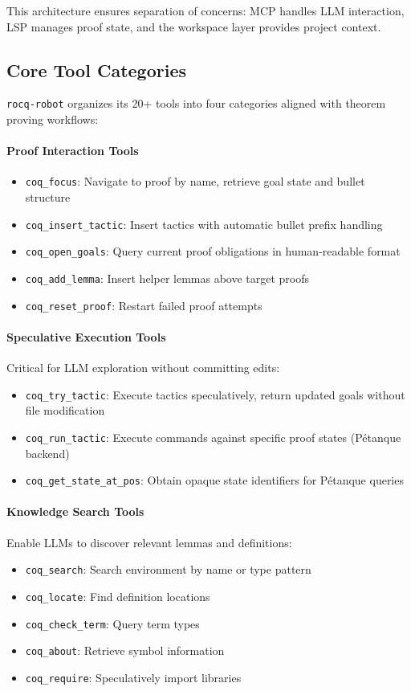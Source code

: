\documentclass[11pt,a4paper]{article}
\newcommand{\tool}{\texttt{rocq-robot}\xspace}
\begin{document}
This architecture ensures separation of concerns: MCP handles LLM interaction, LSP manages proof state, and the workspace layer provides project context.

\subsection{Core Tool Categories}

\tool organizes its 20+ tools into four categories aligned with theorem proving workflows:

\paragraph{Proof Interaction Tools}
\begin{itemize}
\item \texttt{coq\_focus}: Navigate to proof by name, retrieve goal state and bullet structure
\item \texttt{coq\_insert\_tactic}: Insert tactics with automatic bullet prefix handling
\item \texttt{coq\_open\_goals}: Query current proof obligations in human-readable format
\item \texttt{coq\_add\_lemma}: Insert helper lemmas above target proofs
\item \texttt{coq\_reset\_proof}: Restart failed proof attempts
\end{itemize}

\paragraph{Speculative Execution Tools}
Critical for LLM exploration without committing edits:
\begin{itemize}
\item \texttt{coq\_try\_tactic}: Execute tactics speculatively, return updated goals without file modification
\item \texttt{coq\_run\_tactic}: Execute commands against specific proof states (P\'etanque backend)
\item \texttt{coq\_get\_state\_at\_pos}: Obtain opaque state identifiers for P\'etanque queries
\end{itemize}

\paragraph{Knowledge Search Tools}
Enable LLMs to discover relevant lemmas and definitions:
\begin{itemize}
\item \texttt{coq\_search}: Search environment by name or type pattern
\item \texttt{coq\_locate}: Find definition locations
\item \texttt{coq\_check\_term}: Query term types
\item \texttt{coq\_about}: Retrieve symbol information
\item \texttt{coq\_require}: Speculatively import libraries
\end{itemize}
\end{document}
